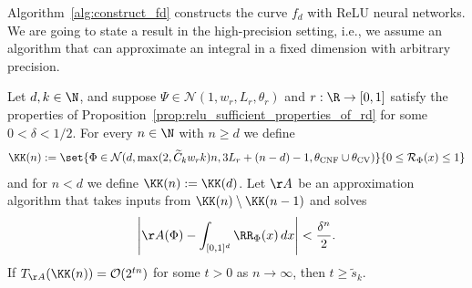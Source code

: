 \documentclass{amsart}[11pt]
\numberwithin{equation}{section}
\newcommand{\nn}{\mathcal{N}}
\newcommand{\realization}{\mathcal{R}}
\newcommand{\order}{\mathcal{O}}
\newcommand{\worstTime}{T}
\numberwithin{theorem}{section}
\begin{document}
Algorithm~\ref{alg:construct_fd} constructs the curve $f_d$ with ReLU neural networks. We are going to state a result in the high-precision setting, i.e., we assume an algorithm that can
approximate an integral in a fixed dimension with arbitrary precision.
\begin{theorem}\label{thm:hardness_hypercube1}
    Let $d, k\in \N$, and suppose $\Psi \in \nn(1, w_r, L_r, \theta_r)$ and $r: \R \to [0, 1]$ satisfy the properties of Proposition~\ref{prop:relu_sufficient_properties_of_rd} for some $0 < \delta < 1/2$. For every $n \in \N$ with $n \geq d$ we define
    \begin{align*}
        \KK(n) := \set{ \Phi \in \nn(d, \max(2, \widetilde C_k w_r k)n, 3L_r + (n - d) - 1,\theta_{\rm{CNF}} \cup \theta_{\rm CV})}{0\leq\realization_\Phi(x) \leq 1}
    \end{align*}
    and for $n < d$ we define $\KK(n) := \KK(d)$. Let $\AA$ be an approximation algorithm that takes inputs from $\KK(n)\setminus\KK(n-1)$ and solves
    \begin{align*}
        \left|\AA(\Phi) - \int_{[0, 1]^d} \RR_\Phi(x) \, dx\right| < \frac{\delta^n}{2}.
    \end{align*}
    If $\worstTime_{\AA}(\KK(n)) = \order(2^{tn})$ for some $t>0$ as $n \to \infty$, then $t \geq \widetilde s_k$.
\end{theorem}
\end{document}
